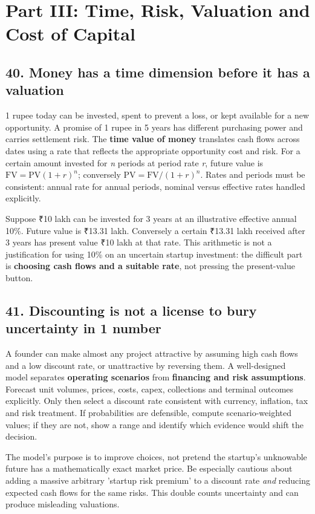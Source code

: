 \section{Part III: Time, Risk, Valuation and Cost of Capital}

\subsection{40. Money has a time dimension before it has a valuation}


1 rupee today can be invested, spent to prevent a loss, or kept available for a new opportunity. A promise of 1 rupee in 5 years has different purchasing power and carries settlement risk. The \textbf{time value of money} translates cash flows across dates using a rate that reflects the appropriate opportunity cost and risk. For a certain amount invested for \textit{n} periods at period rate \textit{r}, future value is $\mathrm{FV} = \mathrm{PV}(1+r)^n$; conversely $\mathrm{PV} = \mathrm{FV}/(1+r)^n$. Rates and periods must be consistent: annual rate for annual periods, nominal versus effective rates handled explicitly.

Suppose ₹10 lakh can be invested for 3 years at an illustrative effective annual 10\%. Future value is ₹13.31 lakh. Conversely a certain ₹13.31 lakh received after 3 years has present value ₹10 lakh at that rate. This arithmetic is not a justification for using 10\% on an uncertain startup investment: the difficult part is \textbf{choosing cash flows and a suitable rate}, not pressing the present-value button.

\subsection{41. Discounting is not a license to bury uncertainty in 1 number}


A founder can make almost any project attractive by assuming high cash flows and a low discount rate, or unattractive by reversing them. A well-designed model separates \textbf{operating scenarios} from \textbf{financing and risk assumptions}. Forecast unit volumes, prices, costs, capex, collections and terminal outcomes explicitly. Only then select a discount rate consistent with currency, inflation, tax and risk treatment. If probabilities are defensible, compute scenario-weighted values; if they are not, show a range and identify which evidence would shift the decision.

The model's purpose is to improve choices, not pretend the startup's unknowable future has a mathematically exact market price. Be especially cautious about adding a massive arbitrary 'startup risk premium' to a discount rate \textit{and} reducing expected cash flows for the same risks. This double counts uncertainty and can produce misleading valuations.

